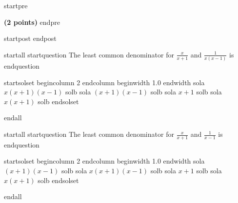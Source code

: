 
startpre
\item {\bf (2 points)} 
endpre

startpost
endpost

startall
startquestion The least common denominator for $\displaystyle \frac{x}{x+1}$ and $\displaystyle \frac{1}{x(x-1)}$ is \vspace{.2cm}
endquestion 

startsolset
begincolumn 2 endcolumn
beginwidth 1.0 endwidth
sola $x(x+1)(x-1)$ solb
sola $(x+1)(x-1)$ solb
sola $x+1$ solb
sola $x(x+1)$ solb
endsolset

endall


startall
startquestion The least common denominator for $\displaystyle \frac{x}{x+1}$ and $\displaystyle \frac{1}{x-1}$ is \vspace{.2cm}
endquestion 

startsolset
begincolumn 2 endcolumn
beginwidth 1.0 endwidth
sola $(x+1)(x-1)$ solb
sola $x(x+1)(x-1)$ solb
sola $x+1$ solb
sola $x(x+1)$ solb
endsolset

endall
